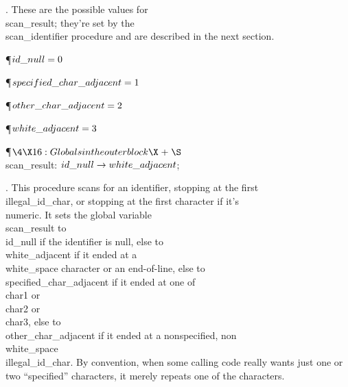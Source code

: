 .
These are the possible values for \\{scan\_result}; they're set by the
\\{scan\_identifier} procedure and are described in the next section.

\Y\P\D {}$\\{id\_null}=0$\par
\P\D {}$\\{specified\_char\_adjacent}=1$\par
\P\D {}$\\{other\_char\_adjacent}=2$\par
\P\D {}$\\{white\_adjacent}=3$\par
\Y\P$\4\X16:Globals in the outer block\X\mathrel{+}\S$\6
\4\\{scan\_result}: $\\{id\_null}\to\\{white\_adjacent}$;\par
\fi

.
This procedure scans for an identifier, stopping at the first
\\{illegal\_id\_char}, or stopping at the first character if it's
\\{numeric}.  It sets the global variable \\{scan\_result} to \\{id\_null} if
the identifier is null, else to \\{white\_adjacent} if it ended at a
\\{white\_space} character or an end-of-line, else to
\\{specified\_char\_adjacent} if it ended at one of \\{char1} or \\{char2} or
\\{char3}, else to \\{other\_char\_adjacent} if it ended at a nonspecified,
non\\{white\_space} \\{illegal\_id\_char}.  By convention, when some calling
code really wants just one or two ``specified'' characters, it merely
repeats one of the characters.

